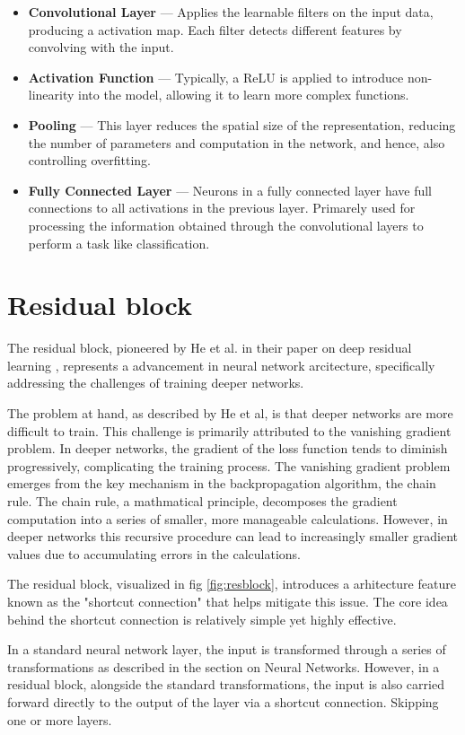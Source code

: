 \begin{itemize}
    \item \textbf{Convolutional Layer} — Applies the learnable filters on the input data, producing a activation map. Each filter detects different features by convolving with the input.
    \item \textbf{Activation Function} — Typically, a ReLU is applied to introduce non-linearity into the model, allowing it to learn more complex functions.
    \item \textbf{Pooling} — This layer reduces the spatial size of the representation, reducing the number of parameters and computation in the network, and hence, also controlling overfitting. 
    \item \textbf{Fully Connected Layer} — Neurons in a fully connected layer have full connections to all activations in the previous layer. Primarely used for processing the information obtained through the convolutional layers to perform a task like classification.
\end{itemize}

\section{Residual block}
The residual block, pioneered by He et al. in their paper on deep residual learning \cite{ResLearn}, represents a advancement in neural network arcitecture, 
specifically addressing the challenges of training deeper networks.

The problem at hand, as described by He et al, is that deeper networks are more difficult to train. This challenge is primarily attributed to the vanishing gradient problem.
In deeper networks, the gradient of the loss function tends to diminish progressively, complicating the training process. 
The vanishing gradient problem emerges from the key mechanism in the backpropagation algorithm, the chain rule. The chain rule, a mathmatical principle, decomposes the gradient computation into a series of smaller,
more manageable calculations. However, in deeper networks this recursive procedure can lead to increasingly smaller gradient values due to accumulating errors in the calculations. 

The residual block, visualized in fig \ref{fig:resblock}, introduces a arhitecture feature known as the "shortcut connection" that helps mitigate this issue. 
The core idea behind the shortcut connection is relatively simple yet highly effective.

In a standard neural network layer, the input is transformed through a series of transformations as described in the section on Neural Networks. However, in a residual block, alongside the standard transformations,
the input is also carried forward directly to the output of the layer via a shortcut connection. Skipping one or more layers.

